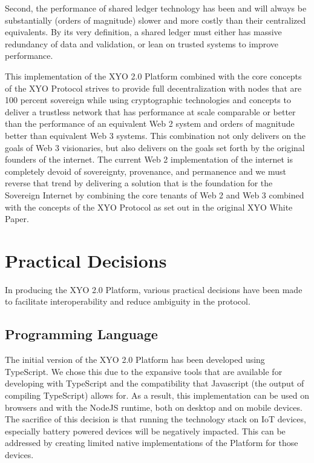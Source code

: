 \documentclass{article}
\begin{document}
Second, the performance of shared ledger technology has been and will always be substantially (orders of magnitude) slower and more costly than their centralized equivalents.  By its very definition, a shared ledger must either has massive redundancy of data and validation, or lean on trusted systems to improve performance.

This implementation of the XYO 2.0 Platform combined with the core concepts of the XYO Protocol strives to provide full decentralization with nodes that are 100 percent sovereign while using cryptographic technologies and concepts to deliver a trustless network that has performance at scale comparable or better than the performance of an equivalent Web 2 system and orders of magnitude better than equivalent Web 3 systems.  This combination not only delivers on the goals of Web 3 visionaries, but also delivers on the goals set forth by the original founders of the internet. The current Web 2 implementation of the internet is completely devoid of sovereignty, provenance, and permanence and we must reverse that trend by delivering a solution that is the foundation for the Sovereign Internet by combining the core tenants of Web 2 and Web 3 combined with the concepts of the XYO Protocol as set out in the original XYO White Paper.  

\clearpage
\section{Practical Decisions}
In producing the XYO 2.0 Platform, various practical decisions have been made to facilitate interoperability and reduce ambiguity in the protocol.

\subsection{Programming Language}
The initial version of the XYO 2.0 Platform has been developed using TypeScript.  We chose this due to the expansive tools that are available for developing with TypeScript and the compatibility that Javascript (the output of compiling TypeScript) allows for.  As a result, this implementation can be used on browsers and with the NodeJS runtime, both on desktop and on mobile devices.  The sacrifice of this decision is that running the technology stack on IoT devices, especially battery powered devices will be negatively impacted.  This can be addressed by creating limited native implementations of the Platform for those devices.
\end{document}
